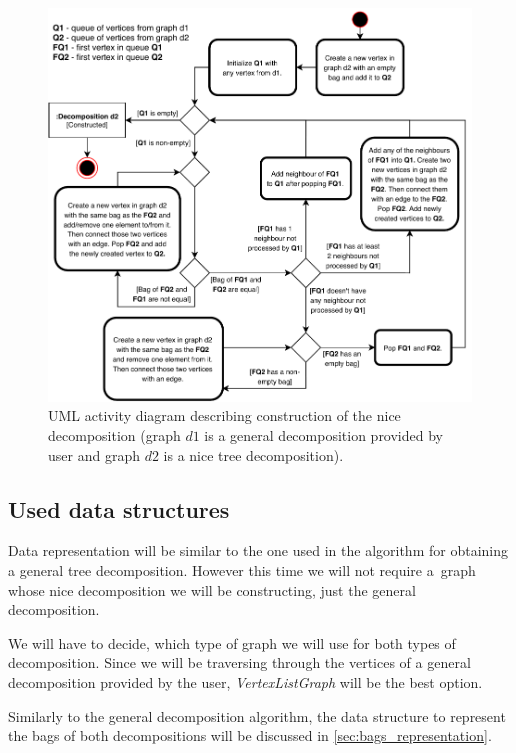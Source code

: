 \documentclass[thesis=B,english]{FITthesis}[2019/03/21]
\begin{document}
\begin{figure}
	\centering
 	\includegraphics[width=1\textwidth]{img/ntd-activity-diagram.pdf}
 	\caption[UML activity diagram describing construction of the nice decomposition]{UML activity diagram describing construction of the nice decomposition (graph $d1$ is a general decomposition provided by user and graph $d2$ is a nice tree decomposition).}
 	\label{fig:ntd_activity_diagram}
\end{figure}

\subsection{Used data structures}\label{ssec:ntd_data_structures}
Data representation will be similar to the one used in the algorithm for obtaining a general tree decomposition. However this time we will not require a~graph whose nice decomposition we will be constructing, just the general decomposition.

We will have to decide, which type of graph we will use for both types of decomposition. Since we will be traversing through the vertices of a general decomposition provided by the user, \emph{VertexListGraph} will be the best option.

Similarly to the general decomposition algorithm, the data structure to represent the bags of both decompositions will be discussed in \autoref{sec:bags_representation}.
\end{document}
